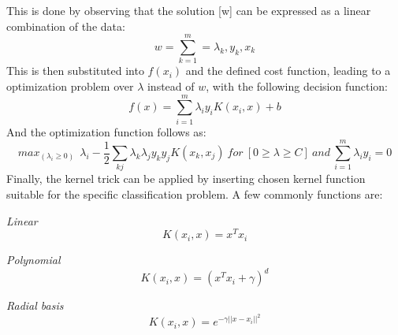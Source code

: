 This is done by observing that the solution [w] can be expressed as a linear combination of the data:
\begin{equation}
	w = \sum_{k=1}^m = \lambda_k,y_k,x_k
\end{equation}
This is then substituted into $f(x_i)$ and the defined cost function, leading to a optimization problem over $\lambda$ instead of $w$, with the following decision function:
\begin{equation}
	f(x) = \sum_{i=1}^m \lambda_iy_iK(x_i,x)+b
\end{equation}
And the optimization function follows as:
\begin{equation}
	max_{(\lambda_i \geq 0)} \ \  \lambda_i - \frac{1}{2}\sum_{kj} \lambda_k\lambda_jy_ky_jK(x_k,x_j)\ for\ [ 0 \geq \lambda \geq C]\  and\  \sum_{i=1}^m \lambda_iy_i = 0
\end{equation}
Finally, the kernel trick can be applied by inserting chosen kernel function suitable for the specific classification problem. A few commonly functions are:
\\
\par
\qquad\textit{Linear}
 \begin{equation}
 K(x_i,x) = x^Tx_i
 \end{equation}
\par
\qquad\textit{Polynomial}
 \begin{equation}
 K(x_i,x) = (x^Tx_i + \gamma)^d
 \end{equation}
\par
\qquad\textit{Radial basis}
 \begin{equation}
 K(x_i,x) = e^{-\gamma||x-x_i||^2}
 \end{equation}
\par

